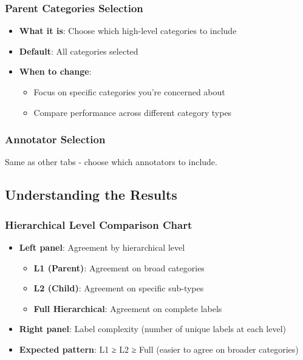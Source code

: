 \documentclass[11pt]{article}
\begin{document}
\subsubsection{Parent Categories Selection}
\begin{itemize}
\item \textbf{What it is}: Choose which high-level categories to include
\item \textbf{Default}: All categories selected
\item \textbf{When to change}: 
\begin{itemize}
\item Focus on specific categories you're concerned about
\item Compare performance across different category types
\end{itemize}
\end{itemize}

\subsubsection{Annotator Selection}
Same as other tabs - choose which annotators to include.

\subsection{Understanding the Results}

\subsubsection{Hierarchical Level Comparison Chart}
\begin{itemize}
\item \textbf{Left panel}: Agreement by hierarchical level
\begin{itemize}
\item \textbf{L1 (Parent)}: Agreement on broad categories
\item \textbf{L2 (Child)}: Agreement on specific sub-types
\item \textbf{Full Hierarchical}: Agreement on complete labels
\end{itemize}
\item \textbf{Right panel}: Label complexity (number of unique labels at each level)
\item \textbf{Expected pattern}: L1 ≥ L2 ≥ Full (easier to agree on broader categories)
\end{itemize}
\end{document}
